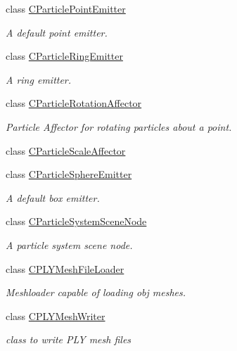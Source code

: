 \begin{DoxyCompactItemize}
class \hyperlink{classirr_1_1scene_1_1_c_particle_point_emitter}{C\-Particle\-Point\-Emitter}
\begin{DoxyCompactList}\small\item\em A default point emitter. \end{DoxyCompactList}\item 
class \hyperlink{classirr_1_1scene_1_1_c_particle_ring_emitter}{C\-Particle\-Ring\-Emitter}
\begin{DoxyCompactList}\small\item\em A ring emitter. \end{DoxyCompactList}\item 
class \hyperlink{classirr_1_1scene_1_1_c_particle_rotation_affector}{C\-Particle\-Rotation\-Affector}
\begin{DoxyCompactList}\small\item\em Particle Affector for rotating particles about a point. \end{DoxyCompactList}\item 
class \hyperlink{classirr_1_1scene_1_1_c_particle_scale_affector}{C\-Particle\-Scale\-Affector}
\item 
class \hyperlink{classirr_1_1scene_1_1_c_particle_sphere_emitter}{C\-Particle\-Sphere\-Emitter}
\begin{DoxyCompactList}\small\item\em A default box emitter. \end{DoxyCompactList}\item 
class \hyperlink{classirr_1_1scene_1_1_c_particle_system_scene_node}{C\-Particle\-System\-Scene\-Node}
\begin{DoxyCompactList}\small\item\em A particle system scene node. \end{DoxyCompactList}\item 
class \hyperlink{classirr_1_1scene_1_1_c_p_l_y_mesh_file_loader}{C\-P\-L\-Y\-Mesh\-File\-Loader}
\begin{DoxyCompactList}\small\item\em Meshloader capable of loading obj meshes. \end{DoxyCompactList}\item 
class \hyperlink{classirr_1_1scene_1_1_c_p_l_y_mesh_writer}{C\-P\-L\-Y\-Mesh\-Writer}
\begin{DoxyCompactList}\small\item\em class to write P\-L\-Y mesh files \end{DoxyCompactList}\item 

\end{DoxyCompactItemize}
